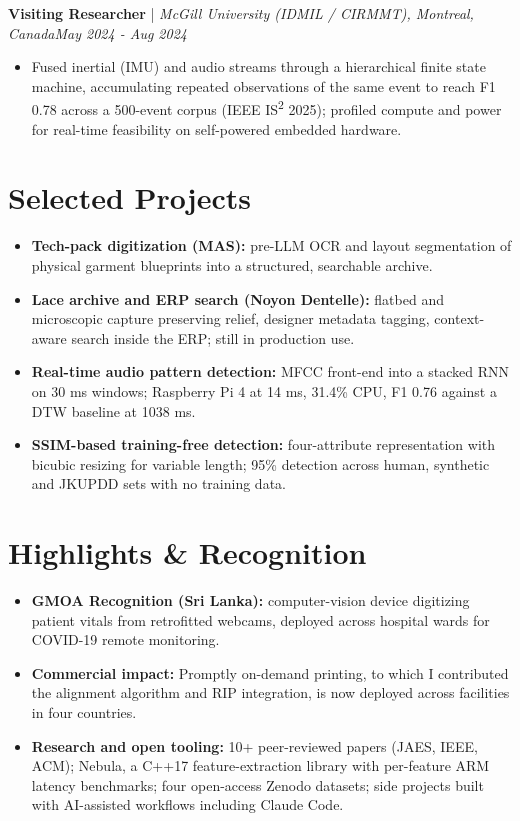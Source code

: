 \documentclass[11pt]{article}
\newenvironment{cvrole}[5]{%
  \par\noindent\textbf{\large #1} | \textit{\small #2, #3}\hfill \textit{\small #4 - #5}\par
  \begin{itemize}[leftmargin=2em, itemsep=-0.3em, topsep=-0.5em]%
}{%
  \end{itemize}\par\noindent\mbox{}\par\vspace{0.1em}%
}
\begin{document}
\begin{cvrole}{Visiting Researcher}{McGill University (IDMIL / CIRMMT)}{Montreal, Canada}{May 2024}{Aug 2024}
    \item Fused inertial (IMU) and audio streams through a hierarchical finite state machine, accumulating repeated observations of the same event to reach F1 0.78 across a 500-event corpus (IEEE IS\textsuperscript{2} 2025); profiled compute and power for real-time feasibility on self-powered embedded hardware.
\end{cvrole}

\section*{Selected Projects \footnotesize {}}
\begin{itemize}[leftmargin=1.2em, itemsep=-0.25em]
    \item \textbf{Tech-pack digitization (MAS):} pre-LLM OCR and layout segmentation of physical garment blueprints into a structured, searchable archive.
    \item \textbf{Lace archive and ERP search (Noyon Dentelle):} flatbed and microscopic capture preserving relief, designer metadata tagging, context-aware search inside the ERP; still in production use.
    \item \textbf{Real-time audio pattern detection:} MFCC front-end into a stacked RNN on 30 ms windows; Raspberry Pi 4 at 14 ms, 31.4\% CPU, F1 0.76 against a DTW baseline at 1038 ms.
    \item \textbf{SSIM-based training-free detection:} four-attribute representation with bicubic resizing for variable length; 95\% detection across human, synthetic and JKUPDD sets with no training data.
\end{itemize}

\enlargethispage{4\baselineskip}
\vspace{-0.5em}
\section*{Highlights \& Recognition}
\begin{itemize}[leftmargin=1.2em, itemsep=-0.25em]
    \item \textbf{GMOA Recognition (Sri Lanka):} computer-vision device digitizing patient vitals from retrofitted webcams, deployed across hospital wards for COVID-19 remote monitoring.
    \item \textbf{Commercial impact:} Promptly on-demand printing, to which I contributed the alignment algorithm and RIP integration, is now deployed across facilities in four countries.
    \item \textbf{Research and open tooling:} 10+ peer-reviewed papers (JAES, IEEE, ACM); Nebula, a C++17 feature-extraction library with per-feature ARM latency benchmarks; four open-access Zenodo datasets; side projects built with AI-assisted workflows including Claude Code.
\end{itemize}
\end{document}
